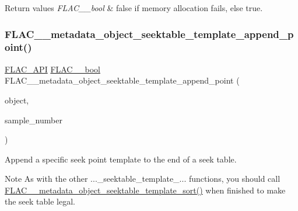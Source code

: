 \begin{DoxyRetVals}{Return values}
{\em F\+L\+A\+C\+\_\+\+\_\+bool} & {\ttfamily false} if memory allocation fails, else {\ttfamily true}. \\
\hline
\end{DoxyRetVals}
\mbox{\label{group__flac__metadata__object_ga9ce1940ca29d71739316cf104256c078}} 
\subsubsection{\texorpdfstring{FLAC\_\_metadata\_object\_seektable\_template\_append\_point()}{FLAC\_\_metadata\_object\_seektable\_template\_append\_point()}}
{\footnotesize\ttfamily \mbox{\hyperlink{group__flac__export_ga56ca07df8a23310707732b1c0007d6f5}{F\+L\+A\+C\+\_\+\+A\+PI}} \mbox{\hyperlink{ordinals_8h_a95103469f1cbd78b8cf250194985b34e}{F\+L\+A\+C\+\_\+\+\_\+bool}} F\+L\+A\+C\+\_\+\+\_\+metadata\+\_\+object\+\_\+seektable\+\_\+template\+\_\+append\+\_\+point (\begin{DoxyParamCaption}\item[{\mbox{\hyperlink{struct_f_l_a_c_____stream_metadata}{F\+L\+A\+C\+\_\+\+\_\+\+Stream\+Metadata}} $\ast$}]{object,  }\item[{\mbox{\hyperlink{ordinals_8h_aa78c8c70a3eb8a58af7436f278acde8e}{F\+L\+A\+C\+\_\+\+\_\+uint64}}}]{sample\+\_\+number }\end{DoxyParamCaption})}

Append a specific seek point template to the end of a seek table.

\begin{DoxyNote}{Note}
As with the other ...\+\_\+seektable\+\_\+template\+\_\+... functions, you should call \mbox{\hyperlink{group__flac__metadata__object_gaee6a1f08321b56a3fa65af94dd7830cd}{F\+L\+A\+C\+\_\+\+\_\+metadata\+\_\+object\+\_\+seektable\+\_\+template\+\_\+sort()}} when finished to make the seek table legal.
\end{DoxyNote}

